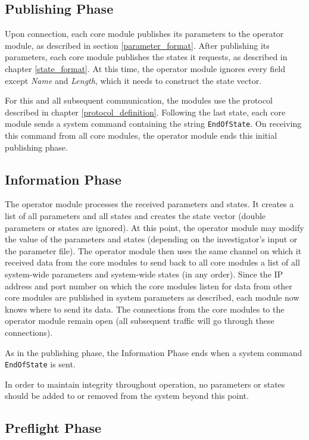 \documentclass[letterpaper,oneside,12pt]{book}
\begin{document}
\subsection{Publishing Phase}

Upon connection, each core module publishes its parameters to the operator 
module, as described in section \ref{parameter_format}. After publishing its 
parameters, each core module publishes the states it requests, as described in 
chapter \ref{state_format}. At this time, the operator module ignores every 
field except \textit{Name} and \textit{Length}, which it needs to construct the 
state vector.

For this and all subsequent communication, the modules use the protocol 
described in chapter \ref{protocol_definition}. Following the last state, each core module sends a system command containing the string \texttt{EndOfState}.
On receiving this command from all core modules, the operator module ends 
this initial publishing phase.

\subsection{Information Phase}

The operator module processes the received parameters and states. It creates a 
list of all parameters and all states and creates the state vector (double 
parameters or states are ignored). At this point, the operator module may modify 
the value of the parameters and states (depending on the investigator's input or 
the parameter file). The operator module then uses the same channel on which it 
received data from the core modules to send back to all core modules a list of 
all system-wide parameters and system-wide states (in any order). Since the IP 
address and port number on which the core modules listen for data from other 
core modules are published in system parameters as described, each module now 
knows where to send its data. The connections from the core modules to the 
operator module remain open (all subsequent traffic will go through these 
connections).

As in the publishing phase, the Information Phase ends when a system command 
\texttt{EndOfState} is sent.

In order to maintain integrity throughout operation, no parameters or states 
should be added to or removed from the system beyond this point.

\subsection{Preflight Phase}
\end{document}

